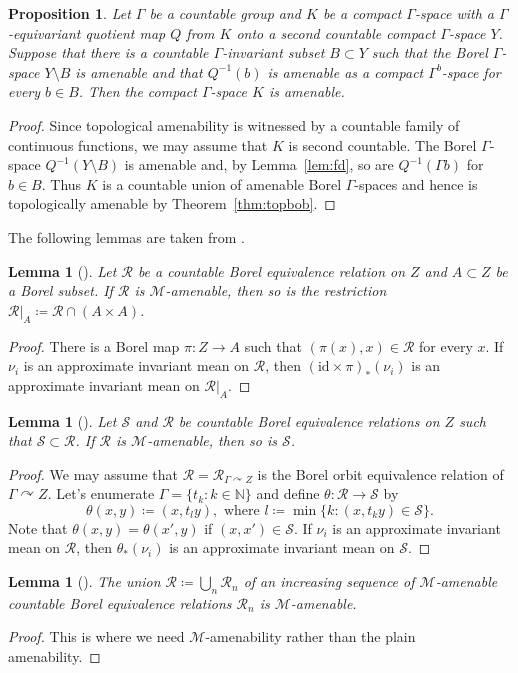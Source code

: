 \documentclass[12pt,nosumlimits,nonamelimits]{amsart}
\newtheorem{prop}[thm]{Proposition}
\newtheorem{lem}[thm]{Lemma}
\theoremstyle{remark}
\theoremstyle{definition}
\newcommand{\IN}{\mathbb{N}}
\newcommand{\cM}{\mathcal{M}}
\newcommand{\cR}{\mathcal{R}}
\newcommand{\cS}{\mathcal{S}}
\newcommand{\Ga}{\Gamma}
\newcommand{\acts}{\curvearrowright}
\newcommand{\id}{\mathrm{id}}
\begin{document}
\begin{prop}\label{prop:amencriterion}
Let $\Ga$ be a countable group and 
$K$ be a compact $\Ga$-space 
with a $\Ga$-equi\-variant quotient map $Q$ from 
$K$ onto a second countable compact $\Ga$-space $Y$. 
Suppose that there is a countable $\Ga$-invariant subset 
$B\subset Y$ such that the Borel $\Ga$-space 
$Y\setminus B$ is amenable and that 
$Q^{-1}(b)$ is amenable as a compact $\Ga^b$-space 
for every $b\in B$.
Then the compact $\Ga$-space $K$ is amenable.  
\end{prop}
\begin{proof}
Since topological amenability is witnessed by 
a countable family of continuous functions, 
we may assume that $K$ is second countable. 
The Borel $\Ga$-space
$Q^{-1}(Y\setminus B)$ is amenable and, by Lemma~\ref{lem:fd}, 
so are $Q^{-1}(\Ga b)$ for $b\in B$. 
Thus $K$ is a countable union of amenable Borel $\Ga$-spaces 
and hence is topologically amenable 
by Theorem~\ref{thm:topbob}. 
\end{proof}

The following lemmas are taken from \cite{jkl}.

\begin{lem}[\cite{jkl}]
Let $\cR$ be a countable Borel equivalence relation on $Z$ 
and $A\subset Z$ be a Borel subset. 
If $\cR$ is $\cM$-amenable, 
then so is the restriction $\cR|_A \coloneq \cR\cap(A\times A)$.  
\end{lem}
\begin{proof}
There is a Borel map $\pi\colon Z\to A$ 
such that $(\pi(x),x)\in\cR$ for every $x$. 
If $\nu_i$ is an approximate invariant mean on $\cR$, 
then $(\id\times\pi)_*(\nu_i)$ is an approximate invariant mean on $\cR|_A$.
\end{proof}

\begin{lem}[\cite{jkl}]
Let $\cS$ and $\cR$ be countable Borel equivalence relations 
on $Z$ such that $\cS\subset\cR$. 
If $\cR$ is $\cM$-amenable, then so is $\cS$.
\end{lem}
\begin{proof}
We may assume that $\cR=\cR_{\Ga\acts Z}$ 
is the Borel orbit equivalence relation of $\Ga\acts Z$.  
Let's enumerate $\Ga = \{ t_k : k \in \IN\}$ and 
define $\theta\colon\cR\to\cS$ by 
\[
\theta(x,y) \coloneq (x, t_l y),\mbox{ where } l \coloneq \min\{ k : (x,t_k y) \in\cS\}.
\]
Note that $\theta(x,y)=\theta(x',y)$ if $(x,x')\in\cS$. 
If $\nu_i$ is an approximate invariant mean on $\cR$, 
then $\theta_*(\nu_i)$ is an approximate invariant mean on $\cS$.
\end{proof}
%
\begin{lem}[\cite{jkl}]\label{lem:becd}
The union $\cR \coloneq \bigcup_n\cR_n$ of 
an increasing sequence of $\cM$-amenable 
countable Borel equivalence relations $\cR_n$ 
is $\cM$-amenable.
\end{lem}
\begin{proof}
This is where we need $\cM$-amenability rather than the plain amenability.
\end{proof}
%
%
\end{document}
